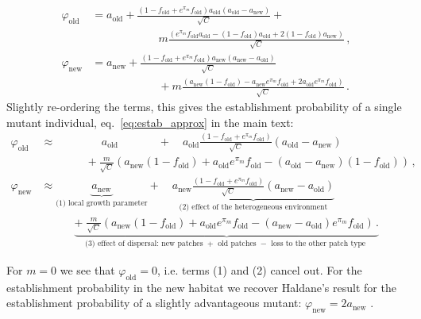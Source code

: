 \documentclass[11pt]{article}
\newcommand{\chg}[1]{\textcolor{change}{#1}}
\begin{document}
\begin{equation}
\begin{aligned}
\varphi_{\text{old}} &= a_{\text{old}} + \frac{(1-f_{\text{old}}+ e^{\pi_m} f_{\text{old}})a_{\text{old}} \left(a_{\text{old}}-a_{\text{new}}\right)}{\sqrt{C}}  + \\
&\qquad \qquad \qquad m \frac{\left( e^{\pi_m} f_{\text{old}} a_{\text{old}} - (1-f_{\text{old}}) a_{\text{old}} + 2 (1-f_{\text{old}}) a_{\text{new}}  \right)}{\sqrt{C}}\, ,\\
\varphi_{\text{new}} &= a_{\text{new}} + \frac{(1-f_{\text{old}}+ e^{\pi_m} f_{\text{old}})a_{\text{new}} \left(a_{\text{new}} - a_{\text{old}}\right)}{\sqrt{C}} \\
&\qquad \qquad \qquad + m \frac{\left(a_{\text{new}} (1-f_{\text{old}}) - a_{\text{new}}  e^{\pi_m} f_{\text{old}} + 2 a_{\text{old}}  e^{\pi_m} f_{\text{old}}  \right)}{\sqrt{C}}\, .
\end{aligned}
\end{equation}
%
Slightly re-ordering the terms, this gives the establishment probability of a single mutant individual, eq.~\eqref{eq:estab_approx} in the main text:
\begin{equation}\label{Seq:estab_approx}
\begin{aligned}
\varphi_{\text{old}} &\approx \qquad \quad \; \; \; \; a_{\text{old}} \qquad \quad \;  \; +  \quad a_{\text{old}} \frac{\left(1-f_{\text{old}}+ e^{\pi_m} f_{\text{old}}\right)}{\sqrt{C}}(a_{\text{old}}-a_{\text{new}}) \\
& \qquad \qquad + \frac{m}{\sqrt{C}} \left(a_{\text{new}}(1-f_{\text{old}}) + a_{\text{old}} e^{\pi_m} f_{\text{old}} - (a_{\text{old}}-a_{\text{new}})(1-f_{\text{old}})\right) \, ,\\
\varphi_{\text{new}} &\approx \underbrace{ a_{\text{new}}}_{\text{(1) local growth parameter}} +  \quad \underbrace{ a_{\text{new}} \frac{\left(1-f_{\text{old}}+ e^{\pi_m} f_{\text{old}}\right)}{\sqrt{C}}(a_{\text{new}}-a_{\text{old}})}_{\text{(2) effect of the heterogeneous environment}} \\
& \qquad \quad \underbrace{+\; \frac{m}{\sqrt{C}}\left( a_{\text{new}}(1-f_{\text{old}}) + a_{\text{old}}  e^{\pi_m} f_{\text{old}} - (a_{\text{new}}-a_{\text{old}})  e^{\pi_m} f_{\text{old}} \right)\, .}_{\text{(3) effect of dispersal: new patches $+$ old patches $-$ loss to the other patch type }}
\end{aligned}
\end{equation}

\chg{For $m=0$ we see that $\varphi_{\text{old}}=0$, i.e. terms (1) and (2) cancel out. For the establishment probability in the new habitat we recover Haldane's result for the establishment probability of a slightly advantageous mutant: $\varphi_{\text{new}}=2a_{\text{new}}$ \citep{haldane_1927}.}
\end{document}
